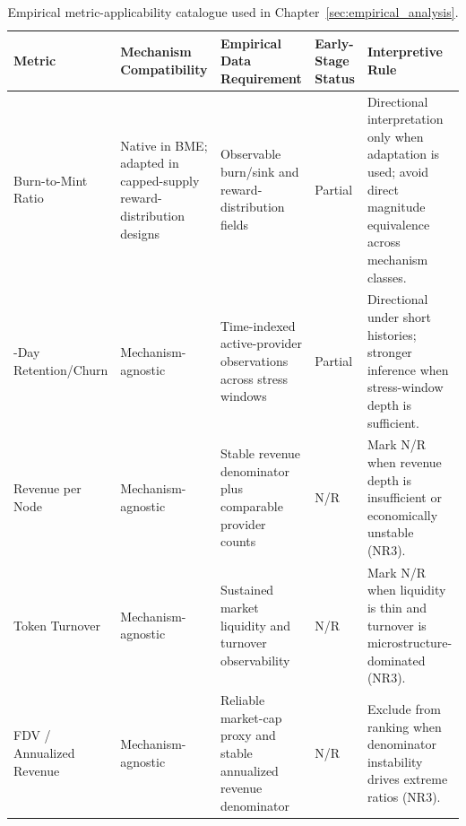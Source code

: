 \begin{table}[ht]
    \centering
    \footnotesize
    \renewcommand{\arraystretch}{1.2}
    \setlength{\tabcolsep}{4pt}
    \begin{tabularx}{\textwidth}{@{}>{\raggedright\arraybackslash}p{}>{\raggedright\arraybackslash}p{}>{\raggedright\arraybackslash}p{}>{\raggedright\arraybackslash}p{}>{\raggedright\arraybackslash}X@{}}
        \toprule
        \textbf{Metric} & \textbf{Mechanism Compatibility} & \textbf{Empirical Data Requirement} & \textbf{Early-Stage Status} & \textbf{Interpretive Rule} \\
        \midrule
        Burn-to-Mint Ratio & Native in BME; adapted in capped-supply reward-distribution designs & Observable burn/sink and reward-distribution fields & Partial & Directional interpretation only when adaptation is used; avoid direct magnitude equivalence across mechanism classes. \\
        30-Day Retention/Churn & Mechanism-agnostic & Time-indexed active-provider observations across stress windows & Partial & Directional under short histories; stronger inference when stress-window depth is sufficient. \\
        Revenue per Node & Mechanism-agnostic & Stable revenue denominator plus comparable provider counts & N/R & Mark N/R when revenue depth is insufficient or economically unstable (NR3). \\
        Token Turnover & Mechanism-agnostic & Sustained market liquidity and turnover observability & N/R & Mark N/R when liquidity is thin and turnover is microstructure-dominated (NR3). \\
        FDV / Annualized Revenue & Mechanism-agnostic & Reliable market-cap proxy and stable annualized revenue denominator & N/R & Exclude from ranking when denominator instability drives extreme ratios (NR3). \\
        \bottomrule
    \end{tabularx}
    \caption{Empirical metric-applicability catalogue used in Chapter~\ref{sec:empirical_analysis}.}
    \label{tab:app_empirical_metric_catalogue}
\end{table}

